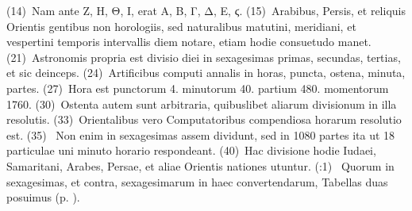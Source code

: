 \documentclass[draft,12pt,twoside,a4paper]{book}
\newcounter{sourcepagenr}
\newcounter{pdfpagenr}
\newcommand{\lnr}[1]{\nrfont({#1})~\normalfont}
\newcommand{\plnr}[3]{%
	\setcounter{pdfpagenr}{{#1}}%
	\setcounter{sourcepagenr}{{#2}}%
	\nrfont(\arabic{sourcepagenr}:{{#3}})~\normalfont%
}
\begin{document}
%
\lnr{14}Nam ante
\textgreek{Ζ, Η, Θ, Ι,} erat \textgreek{Α, Β, Γ, Δ, Ε, ϛ.}
\lnr{15}Arabibus, Persis, et reliquis Orientis
gentibus non horologiis, sed
naturalibus matutini, meridiani,
et vespertini temporis
intervallis diem notare,
etiam hodie consuetudo manet.
\lnr{21}Astronomis propria
est divisio diei in sexagesimas
primas, secundas, tertias,
et sic deinceps.
\lnr{24}Artificibus
computi annalis in
horas, puncta, ostena, minuta,
partes.
\lnr{27}Hora est punctorum
4. minutorum 40.
partium 480. momentorum
1760.
\lnr{30}Ostenta autem sunt arbitraria,
quibuslibet aliarum
divisionum in illa resolutis.
\lnr{33}Orientalibus vero Computatoribus
compendiosa horarum
resolutio est.
\lnr{35}
Non
enim in sexagesimas assem
dividunt, sed in 1080 partes
ita ut 18 particulae uni minuto
horario respondeant.
\lnr{40}Hac divisione hodie Iudaei,
Samaritani, Arabes, Persae,
et aliae Orientis nationes utuntur.
%
\plnr{89}{6}{1}Quorum in sexagesimas, et
contra, sexagesimarum in haec convertendarum, Tabellas duas posuimus
 (p. \pageref{tab:p006}).
%
\end{document}
